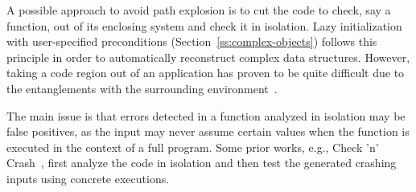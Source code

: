 A possible approach to avoid path explosion is to cut the code to check, say a function, out of its enclosing system and check it in isolation. Lazy initialization with user-specified preconditions (Section~\ref{ss:complex-objects}) follows this principle in order to automatically reconstruct complex  data structures. However, taking a code region out of an application has proven to be quite difficult due to the entanglements with the surrounding environment~\cite{ED-ISSTA07}.

The main issue is that errors detected in a function analyzed in isolation may be false positives, as the input may never assume certain values when the function is executed in the context of a full program. Some prior works, e.g., {\sc Check 'n' Crash}~\cite{CS-ICSE05}, first analyze the code in isolation and then test the generated crashing inputs using concrete executions.


